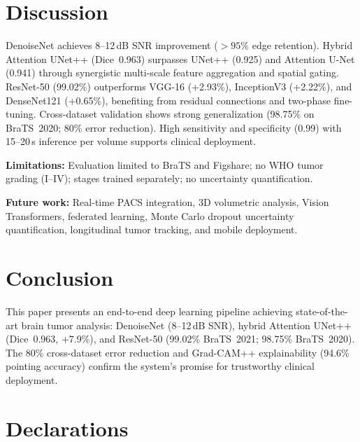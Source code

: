 \documentclass[sn-mathphys-num]{sn-jnl}
\begin{document}
\section{Discussion}\label{sec:discussion}

DenoiseNet achieves 8--12\,dB SNR improvement ($>95\%$ edge retention). Hybrid
Attention UNet++ (Dice~0.963) surpasses UNet++ (0.925) and Attention U-Net (0.941)
through synergistic multi-scale feature aggregation and spatial gating. ResNet-50
(99.02\%) outperforms VGG-16 (+2.93\%), InceptionV3 (+2.22\%), and DenseNet121
(+0.65\%), benefiting from residual connections and two-phase fine-tuning. Cross-dataset
validation shows strong generalization (98.75\% on BraTS~2020; 80\% error reduction).
High sensitivity and specificity (0.99) with 15--20\,s inference per volume supports
clinical deployment.

\textbf{Limitations:} Evaluation limited to BraTS and Figshare; no WHO tumor grading
(I--IV); stages trained separately; no uncertainty quantification.

\textbf{Future work:} Real-time PACS integration, 3D volumetric analysis, Vision
Transformers, federated learning, Monte Carlo dropout uncertainty quantification,
longitudinal tumor tracking, and mobile deployment.

\section{Conclusion}\label{sec:conclusion}

This paper presents an end-to-end deep learning pipeline achieving state-of-the-art
brain tumor analysis: DenoiseNet (8--12\,dB SNR), hybrid Attention UNet++ (Dice~0.963,
+7.9\%), and ResNet-50 (99.02\% BraTS~2021; 98.75\% BraTS~2020). The 80\% cross-dataset
error reduction and Grad-CAM++ explainability (94.6\% pointing accuracy) confirm the
system's promise for trustworthy clinical deployment.

\section*{Declarations}
\end{document}
